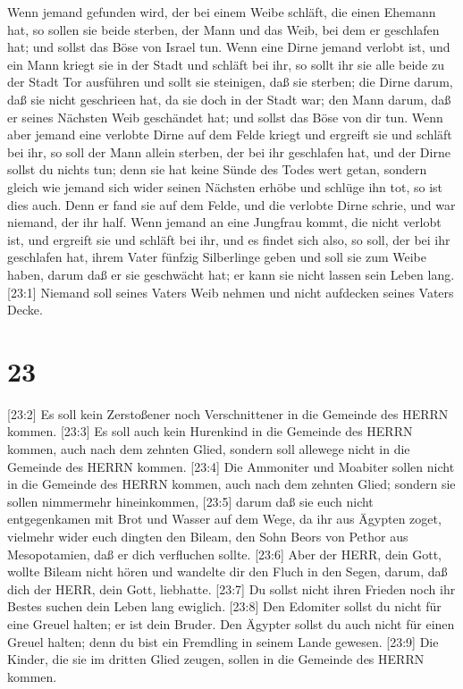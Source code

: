  Wenn jemand gefunden wird, der bei einem Weibe schläft,
die einen Ehemann hat, so sollen sie beide sterben, der Mann und das
Weib, bei dem er geschlafen hat; und sollst das Böse von Israel tun.
 Wenn eine Dirne jemand verlobt ist, und ein Mann kriegt
sie in der Stadt und schläft bei ihr,  so sollt ihr sie
alle beide zu der Stadt Tor ausführen und sollt sie steinigen, daß sie
sterben; die Dirne darum, daß sie nicht geschrieen hat, da sie doch in
der Stadt war; den Mann darum, daß er seines Nächsten Weib geschändet
hat; und sollst das Böse von dir tun.  Wenn aber jemand
eine verlobte Dirne auf dem Felde kriegt und ergreift sie und schläft
bei ihr, so soll der Mann allein sterben, der bei ihr geschlafen hat,
 und der Dirne sollst du nichts tun; denn sie hat keine
Sünde des Todes wert getan, sondern gleich wie jemand sich wider seinen
Nächsten erhöbe und schlüge ihn tot, so ist dies auch. 
Denn er fand sie auf dem Felde, und die verlobte Dirne schrie, und war
niemand, der ihr half.  Wenn jemand an eine Jungfrau kommt,
die nicht verlobt ist, und ergreift sie und schläft bei ihr, und es
findet sich also,  so soll, der bei ihr geschlafen hat,
ihrem Vater fünfzig Silberlinge geben und soll sie zum Weibe haben,
darum daß er sie geschwächt hat; er kann sie nicht lassen sein Leben
lang.  {[}23:1{]} Niemand soll seines Vaters Weib nehmen
und nicht aufdecken seines Vaters Decke.

\hypertarget{section-22}{%
\section{23}\label{section-22}}

 {[}23:2{]} Es soll kein Zerstoßener noch Verschnittener in
die Gemeinde des HERRN kommen.  {[}23:3{]} Es soll auch kein
Hurenkind in die Gemeinde des HERRN kommen, auch nach dem zehnten Glied,
sondern soll allewege nicht in die Gemeinde des HERRN kommen.
 {[}23:4{]} Die Ammoniter und Moabiter sollen nicht in die
Gemeinde des HERRN kommen, auch nach dem zehnten Glied; sondern sie
sollen nimmermehr hineinkommen,  {[}23:5{]} darum daß sie
euch nicht entgegenkamen mit Brot und Wasser auf dem Wege, da ihr aus
Ägypten zoget, vielmehr wider euch dingten den Bileam, den Sohn Beors
von Pethor aus Mesopotamien, daß er dich verfluchen sollte. 
{[}23:6{]} Aber der HERR, dein Gott, wollte Bileam nicht hören und
wandelte dir den Fluch in den Segen, darum, daß dich der HERR, dein
Gott, liebhatte.  {[}23:7{]} Du sollst nicht ihren Frieden
noch ihr Bestes suchen dein Leben lang ewiglich.  {[}23:8{]}
Den Edomiter sollst du nicht für eine Greuel halten; er ist dein Bruder.
Den Ägypter sollst du auch nicht für einen Greuel halten; denn du bist
ein Fremdling in seinem Lande gewesen.  {[}23:9{]} Die
Kinder, die sie im dritten Glied zeugen, sollen in die Gemeinde des
HERRN kommen.

